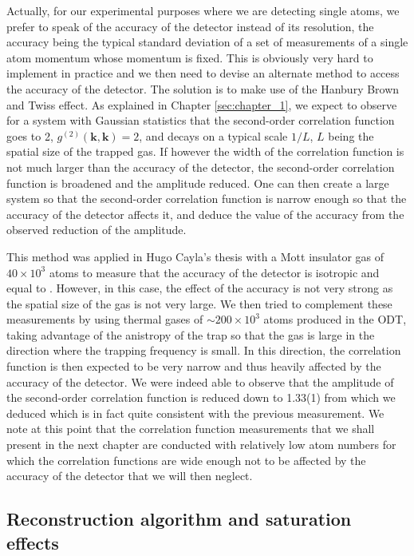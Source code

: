 Actually, for our experimental purposes where we are detecting single atoms, we prefer to speak of the accuracy of the detector instead of its resolution, the accuracy being the typical standard deviation of a set of measurements of a single atom momentum whose momentum is fixed. This is obviously very hard to implement in practice and we then need to devise an alternate method to access the accuracy of the detector. The solution is to make use of the Hanbury Brown and Twiss effect. As explained in Chapter \ref{sec:chapter_1}, we expect to observe for a system with Gaussian statistics that the second-order correlation function goes to 2, $g^{(2)} (\bm{k},\bm{k})=2$, and decays on a typical scale $1/L$, $L$ being the spatial size of the trapped gas. If however the width of the correlation function is not much larger than the accuracy of the detector, the second-order correlation function is broadened and the amplitude reduced. One can then create a large system so that the second-order correlation function is narrow enough so that the accuracy of the detector affects it, and deduce the value of the accuracy from the observed reduction of the amplitude.
 
 This method was applied in Hugo Cayla's thesis \cite{cayla_these} with a Mott insulator gas of $40 \times 10^3$ atoms to measure that the accuracy of the detector is isotropic and equal to . However, in this case, the effect of the accuracy is not very strong as the spatial size of the gas is not very large. We then tried to complement these measurements by using thermal gases of $\sim 200 \times 10^3$ atoms produced in the ODT, taking advantage of the anistropy of the trap so that the gas is large in the direction where the trapping frequency is small. In this direction, the correlation function is then expected to be very narrow and thus heavily affected by the accuracy of the detector. We were indeed able to observe that the amplitude of the second-order correlation function is reduced down to 1.33(1) from which we deduced  which is in fact quite consistent with the previous measurement. We note at this point that the correlation function measurements that we shall present in the next chapter are conducted with relatively low atom numbers for which the correlation functions are wide enough not to be affected by the accuracy of the detector that we will then neglect.


\subsection{Reconstruction algorithm and saturation effects}

